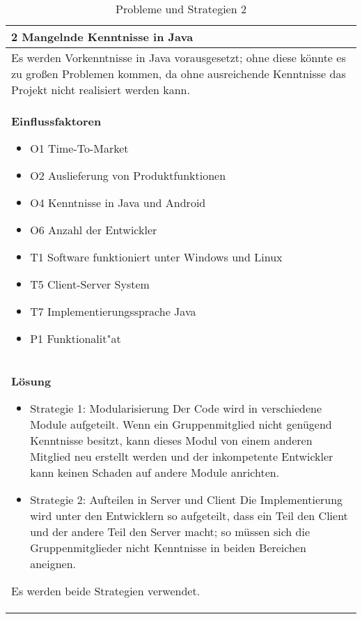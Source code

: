 \begin{table}[H]
\caption{Probleme und Strategien 2}
\begin{tabular}{|p{\textwidth}|}\hline
2 Mangelnde Kenntnisse in Java\\ \hline
Es werden Vorkenntnisse in Java vorausgesetzt; ohne diese könnte es zu großen Problemen kommen, da ohne ausreichende Kenntnisse das Projekt nicht realisiert werden kann.\\ \hline
\textbf{Einflussfaktoren}
\begin{itemize}
\item O1 Time-To-Market
\item O2 Auslieferung von Produktfunktionen
\item O4 Kenntnisse in Java und Android
\item O6 Anzahl der Entwickler
\item T1 Software funktioniert unter Windows und Linux
\item T5 Client-Server System
\item T7 Implementierungssprache Java
\item P1 Funktionalit"at
\end{itemize}\\ \hline
\textbf{Lösung}
\begin{itemize}
\item Strategie 1: Modularisierung \leavevmode\newline
Der Code wird in verschiedene Module aufgeteilt. Wenn ein Gruppenmitglied nicht genügend Kenntnisse besitzt, kann dieses Modul von einem anderen Mitglied neu erstellt werden und der inkompetente Entwickler kann keinen Schaden auf andere Module anrichten.
\item Strategie 2: Aufteilen in Server und Client \leavevmode\newline
Die Implementierung wird unter den Entwicklern so aufgeteilt, dass ein Teil den Client und der andere Teil den Server macht; so müssen sich die Gruppenmitglieder nicht Kenntnisse in beiden Bereichen aneignen.
\end{itemize}
Es werden beide Strategien verwendet.\\ \hline
\end{tabular}
\end{table}


